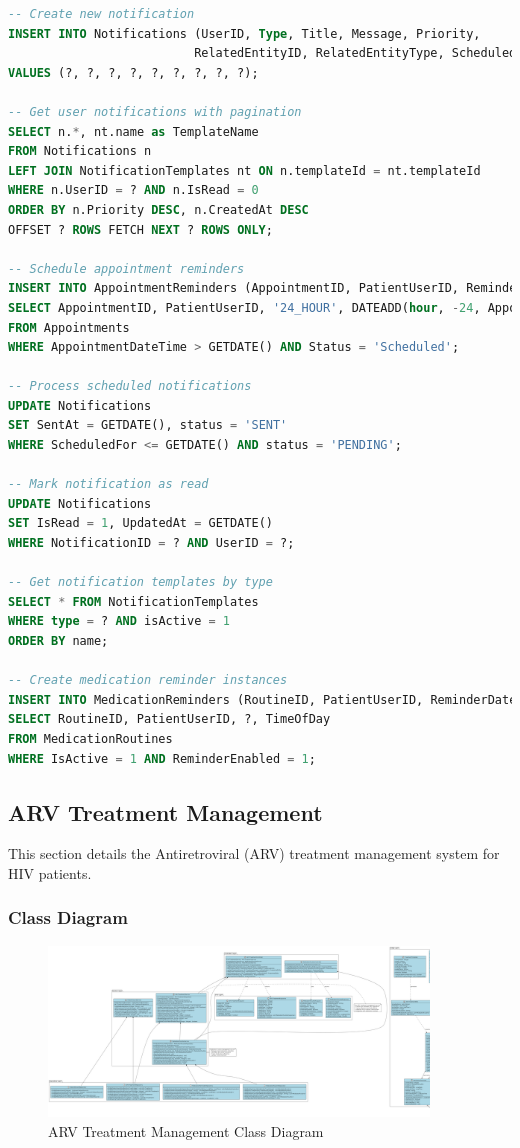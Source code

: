 \documentclass[12pt,a4paper]{article}
\begin{document}
\begin{lstlisting}[language=SQL, caption=Notification Management Queries]
-- Create new notification
INSERT INTO Notifications (UserID, Type, Title, Message, Priority, 
                          RelatedEntityID, RelatedEntityType, ScheduledFor, templateId)
VALUES (?, ?, ?, ?, ?, ?, ?, ?, ?);

-- Get user notifications with pagination
SELECT n.*, nt.name as TemplateName 
FROM Notifications n
LEFT JOIN NotificationTemplates nt ON n.templateId = nt.templateId
WHERE n.UserID = ? AND n.IsRead = 0
ORDER BY n.Priority DESC, n.CreatedAt DESC
OFFSET ? ROWS FETCH NEXT ? ROWS ONLY;

-- Schedule appointment reminders
INSERT INTO AppointmentReminders (AppointmentID, PatientUserID, ReminderType, ReminderDateTime)
SELECT AppointmentID, PatientUserID, '24_HOUR', DATEADD(hour, -24, AppointmentDateTime)
FROM Appointments 
WHERE AppointmentDateTime > GETDATE() AND Status = 'Scheduled';

-- Process scheduled notifications
UPDATE Notifications 
SET SentAt = GETDATE(), status = 'SENT'
WHERE ScheduledFor <= GETDATE() AND status = 'PENDING';

-- Mark notification as read
UPDATE Notifications 
SET IsRead = 1, UpdatedAt = GETDATE()
WHERE NotificationID = ? AND UserID = ?;

-- Get notification templates by type
SELECT * FROM NotificationTemplates 
WHERE type = ? AND isActive = 1 
ORDER BY name;

-- Create medication reminder instances
INSERT INTO MedicationReminders (RoutineID, PatientUserID, ReminderDate, ReminderTime)
SELECT RoutineID, PatientUserID, ?, TimeOfDay
FROM MedicationRoutines 
WHERE IsActive = 1 AND ReminderEnabled = 1;
\end{lstlisting}

\subsection{ARV Treatment Management}

This section details the Antiretroviral (ARV) treatment management system for HIV patients.

\subsubsection{Class Diagram}

\begin{figure}[H]
\centering
\includegraphics[width=0.9\textwidth]{diagrams/arv_treatment_class_diagram.png}
\caption{ARV Treatment Management Class Diagram}
\label{fig:arv-class-diagram}
\end{figure}
\end{document}
